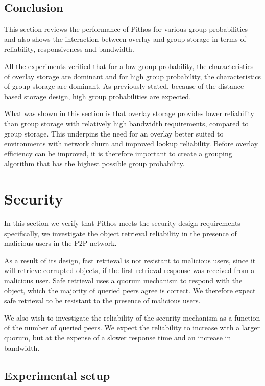 \subsection{Conclusion}

This section reviews the performance of Pithos for various group probabilities and also shows the interaction between overlay and group storage in terms of reliability, responsiveness and bandwidth.

All the experiments verified that for a low group probability, the characteristics of overlay storage are dominant and for high group probability, the characteristics of group storage are dominant. As previously stated, because of the distance-based storage design, high group probabilities are expected.

What was shown in this section is that overlay storage provides lower reliability than group storage with relatively high bandwidth requirements, compared to group storage. This underpins the need for an overlay better suited to environments with network churn and improved lookup reliability. Before overlay efficiency can be improved, it is therefore important to create a grouping algorithm that has the highest possible group probability.

\section{Security}
\label{malicious_results}

In this section we verify that Pithos meets the security design requirements specifically, we investigate the object retrieval reliability in the presence of malicious users in the P2P network.

As a result of its design, fast retrieval is not resistant to malicious users, since it will retrieve corrupted objects, if the first retrieval response was received from a malicious user. Safe retrieval uses a quorum mechanism to respond with the object, which the majority of queried peers agree is correct. We therefore expect safe retrieval to be resistant to the presence of malicious users.

We also wish to investigate the reliability of the security mechanism as a function of the number of queried peers. We expect the reliability to increase with a larger quorum, but at the expense of a slower response time and an increase in bandwidth.

\subsection{Experimental setup}

